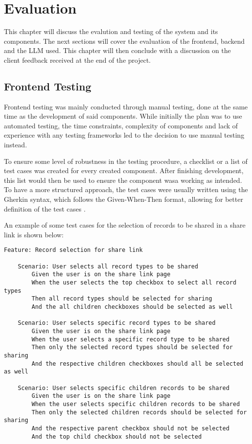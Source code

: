 \chapter{Evaluation}

This chapter will discuss the evalution and testing of the system and its components. The next sections will cover the evaluation of the frontend, backend and the LLM used. This chapter will then conclude with a discussion on the client feedback received at the end of the project.

\section{Frontend Testing}

Frontend testing was mainly conducted through manual testing, done at the same time as the development of said components. While initially the plan was to use automated testing, the time constraints, complexity of components and lack of experience with any testing frameworks led to the decision to use manual testing instead. 

To ensure some level of robustness in the testing procedure, a checklist or a list of test cases was created for every created component. After finishing development, this list would then be used to ensure the component wasa working as intended. To have a more structured approach, the test cases were usually written using the Gherkin syntax, which follows the Given-When-Then format, allowing for better definition of the test cases \parencite{gherkin}. 

An example of some test cases for the selection of records to be shared in a share link is shown below:

\begin{lstlisting}[language=Gherkin, caption=Test cases for selecting records to be shared in a share link]
    Feature: Record selection for share link

    Scenario: User selects all record types to be shared
        Given the user is on the share link page
        When the user selects the top checkbox to select all record types
        Then all record types should be selected for sharing
        And the all children checkboxes should be selected as well 
    
    Scenario: User selects specific record types to be shared
        Given the user is on the share link page
        When the user selects a specific record type to be shared
        Then only the selected record types should be selected for sharing
        And the respective children checkboxes should all be selected as well

    Scenario: User selects specific children records to be shared
        Given the user is on the share link page
        When the user selects specific children records to be shared
        Then only the selected children records should be selected for sharing
        And the respective parent checkbox should not be selected
        And the top child checkbox should not be selected
\end{lstlisting}

